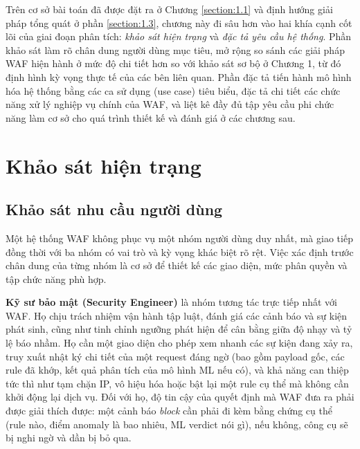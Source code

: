 \documentclass[../DoAn.tex]{subfiles}
\begin{document}
Trên cơ sở bài toán đã được đặt ra ở Chương \ref{section:1.1} và định hướng giải
pháp tổng quát ở phần \ref{section:1.3}, chương này đi sâu hơn vào hai khía cạnh
cốt lõi của giai đoạn phân tích: \textit{khảo sát hiện trạng} và \textit{đặc tả
yêu cầu hệ thống}. Phần khảo sát làm rõ chân dung người dùng mục tiêu, mở rộng so
sánh các giải pháp WAF hiện hành ở mức độ chi tiết hơn so với khảo sát sơ bộ ở
Chương 1, từ đó định hình kỳ vọng thực tế của các bên liên quan. Phần đặc tả tiến
hành mô hình hóa hệ thống bằng các ca sử dụng (use case) tiêu biểu, đặc tả chi
tiết các chức năng xử lý nghiệp vụ chính của WAF, và liệt kê đầy đủ tập yêu cầu
phi chức năng làm cơ sở cho quá trình thiết kế và đánh giá ở các chương sau.

\section{Khảo sát hiện trạng}
\label{section:2.1}

\subsection{Khảo sát nhu cầu người dùng}
\label{subsection:2.1.1}

Một hệ thống WAF không phục vụ một nhóm người dùng duy nhất, mà giao tiếp đồng
thời với ba nhóm có vai trò và kỳ vọng khác biệt rõ rệt. Việc xác định trước
chân dung của từng nhóm là cơ sở để thiết kế các giao diện, mức phân quyền và
tập chức năng phù hợp.

\textbf{Kỹ sư bảo mật (Security Engineer)} là nhóm tương tác trực tiếp nhất với
WAF. Họ chịu trách nhiệm vận hành tập luật, đánh giá các cảnh báo và sự kiện
phát sinh, cũng như tinh chỉnh ngưỡng phát hiện để cân bằng giữa độ nhạy và tỷ
lệ báo nhầm. Họ cần một giao diện cho phép xem nhanh các sự kiện đang xảy ra,
truy xuất nhật ký chi tiết của một request đáng ngờ (bao gồm payload gốc, các
rule đã khớp, kết quả phân tích của mô hình ML nếu có), và khả năng can thiệp
tức thì như tạm chặn IP, vô hiệu hóa hoặc bật lại một rule cụ thể mà không cần
khởi động lại dịch vụ. Đối với họ, độ tin cậy của quyết định mà WAF đưa ra
phải được giải thích được: một cảnh báo \textit{block} cần phải đi kèm bằng
chứng cụ thể (rule nào, điểm anomaly là bao nhiêu, ML verdict nói gì), nếu
không, công cụ sẽ bị nghi ngờ và dần bị bỏ qua.
\end{document}
